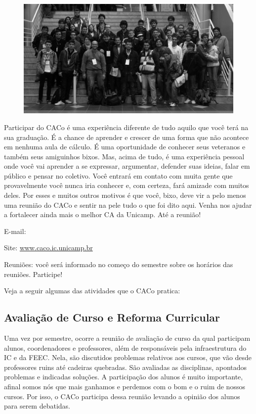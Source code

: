 \begin{figure}[H]
    \centering
    \includegraphics[width=.45\textwidth]{img/alem_da_graduacao/caco_fisl2.jpg}
\end{figure}

Participar do CACo é uma experiência diferente de tudo aquilo que você terá na
sua graduação. É a chance de aprender e crescer de uma forma que não acontece em
nenhuma aula de cálculo. É uma oportunidade de conhecer seus veteranos e também
seus amiguinhos bixos. Mas, acima de tudo, é uma experiência pessoal onde você
vai aprender a se expressar, argumentar, defender suas ideias, falar em público
e pensar no coletivo. Você entrará em contato com muita gente que provavelmente
você nunca iria conhecer e, com certeza, fará amizade com muitos deles. Por
esses e muitos outros motivos é que você, bixo, deve vir a pelo menos uma
reunião do CACo e sentir na pele tudo o que foi dito aqui. Venha nos ajudar a
fortalecer ainda mais o melhor CA da Unicamp. Até a reunião!

\begin{compactitemize}
    \item  E-mail: 
    \item  Site: \url{www.caco.ic.unicamp.br}
    \item  Reuniões: você será informado no começo do semestre sobre os horários
        das reuniões. Participe!
\end{compactitemize}

Veja a seguir algumas das atividades que o CACo pratica:

\subsection{Avaliação de Curso e Reforma Curricular}

Uma vez por semestre, ocorre a reunião de avaliação de curso da qual participam
alunos, coordenadores e professores, além de responsáveis pela infraestrutura do
IC e da FEEC. Nela, são discutidos problemas relativos aos cursos, que vão desde
professores ruins até cadeiras quebradas. São avaliadas as disciplinas,
apontados problemas e indicadas soluções. A participação dos alunos é muito
importante, afinal somos nós que mais ganhamos e perdemos com o bom e o ruim de
nossos cursos. Por isso, o CACo participa dessa reunião levando a opinião dos
alunos para serem debatidas.

